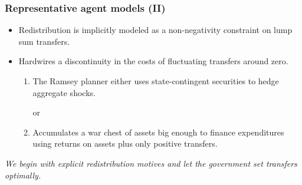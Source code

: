 \documentclass{beamer}
\begin{document}
\begin{frame}
\frametitle{Representative agent models (II)}
\begin{itemize}
\item Redistribution is implicitly modeled as a non-negativity constraint on lump sum transfers. 

\vspace{2mm} 
 \item Hardwires a discontinuity in the costs of fluctuating transfers around zero.
 \begin{enumerate}
  
 \item The Ramsey planner either uses state-contingent securities to hedge aggregate shocks. 
 
 \begin{center}or \end{center}
 
 \item Accumulates a war chest of assets big enough to finance expenditures using returns on assets plus only positive transfers.
 
 \end{enumerate}

 
\end{itemize}

\vspace{2mm} 
\emph{\color{red}We begin with explicit redistribution motives  and let the government set transfers optimally. }

% 
% 
\end{frame}
\end{document}
